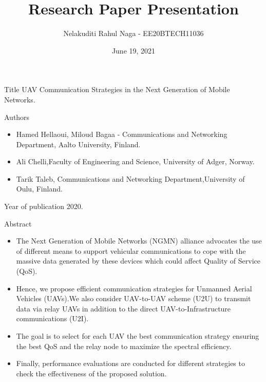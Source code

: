 \documentclass{beamer}
\title{Research Paper Presentation}
\author{Nelakuditi Rahul Naga - EE20BTECH11036}
\date{June 19, 2021}
\begin{document}
\begin{frame}
\titlepage
\end{frame}

\begin{frame}
    \begin{block}{Title}
    UAV Communication Strategies in the Next Generation of Mobile Networks.
    \end{block}
    \begin{block}{Authors}
    \begin{itemize}
        \item Hamed Hellaoui, Miloud Bagaa - Communications and Networking Department, Aalto University, Finland.
        \item Ali Chelli,Faculty of Engineering and Science, University of Adger, Norway.
        \item Tarik Taleb, Communications and Networking Department,University of Oulu, Finland.
    \end{itemize}
    \end{block}
    \begin{block}{Year of publication}
    2020.
    \end{block}
\end{frame}

\begin{frame}{}
\begin{block}{Abstract}
\begin{itemize}
    \item The Next Generation of Mobile Networks (NGMN) alliance advocates the use of different means to support vehicular communications to cope with the massive data generated by these devices which could affect Quality of Service (QoS).
    \item Hence, we propose efficient communication strategies for Unmanned Aerial Vehicles (UAVs).We also consider UAV-to-UAV scheme (U2U) to transmit data via relay UAVs in addition to the direct UAV-to-Infrastructure communications (U2I).
    \item The goal is to select for each UAV the best communication strategy ensuring the best QoS and the relay node to maximize the spectral efficiency.
    \item Finally, performance evaluations are conducted for different strategies to check the effectiveness of the proposed solution.
\end{itemize}
\end{block}
\end{frame}
\end{document}
